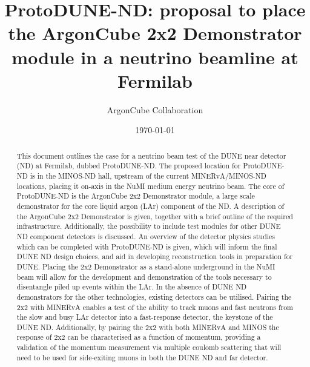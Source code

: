 \documentclass[aps,prd,preprint,superscriptaddress,nofootinbib]{revtex4-1}
\begin{document}
\title{ProtoDUNE-ND: proposal to place the ArgonCube 2x2 Demonstrator module in a neutrino beamline at Fermilab}

\author{ArgonCube Collaboration}

\date{\today}

\begin{abstract}
  This document outlines the case for a neutrino beam test of the DUNE near detector (ND) at Fermilab, dubbed ProtoDUNE-ND. The proposed location for ProtoDUNE-ND is in the MINOS-ND hall, upstream of the current MINERvA/MINOS-ND locations, placing it on-axis in the NuMI medium energy neutrino beam. The core of ProtoDUNE-ND is the ArgonCube 2x2 Demonstrator module, a large scale demonstrator for the core liquid argon (LAr) component of the ND. A description of the ArgonCube 2x2 Demonstrator is given, together with a brief outline of the required infrastructure. Additionally, the possibility to include test modules for other DUNE ND component detectors is discussed. 
  An overview of the detector physics studies which can be completed with ProtoDUNE-ND is given, which will inform the final DUNE ND design choices, and aid in developing reconstruction tools in preparation for DUNE.
  Placing the 2x2 Demonstrator as a stand-alone underground in the NuMI beam will allow for the development and demonstration of the tools necessary to disentangle piled up events within the LAr.
  In the absence of DUNE ND demonstrators for the other technologies, existing detectors can be utilised.
  Pairing the 2x2 with MINERvA enables a test of the ability to track muons and fast neutrons from the slow and busy LAr detector into a fast-response detector, the keystone of the DUNE ND. 
  Additionally, by pairing the 2x2 with both MINERvA and MINOS the response of 2x2 can be characterised as a function of momentum, providing a validation of the momentum measurement via multiple coulomb scattering that will need to be used for side-exiting muons in both the DUNE ND and far detector.
  
\end{abstract}

\maketitle











%
\end{document}
